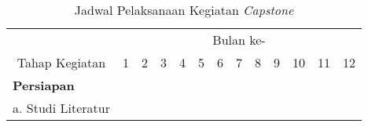         \begin{longtable}{|l|cccccccccccc|}
            \caption{Jadwal Pelaksanaan Kegiatan \textit{Capstone}}
            \label{tab:jadwal_pelaksanaan}
            \vspace{-0.75em}\\
            \hline
\multicolumn{1}{|c|}{}                                 & \multicolumn{12}{c|}{Bulan ke-}                                                                                                                                                                                                                                                                                                                                                                                                                                                                                                                                          \\ \cline{2-13} 
\multicolumn{1}{|c|}{\multirow{-2}{*}{Tahap Kegiatan}} & \multicolumn{1}{c|}{1}                        & \multicolumn{1}{c|}{2}                        & \multicolumn{1}{c|}{3}                        & \multicolumn{1}{c|}{4}                        & \multicolumn{1}{c|}{5}                        & \multicolumn{1}{c|}{6}                        & \multicolumn{1}{c|}{7}                        & \multicolumn{1}{c|}{8}                        & \multicolumn{1}{c|}{9}                        & \multicolumn{1}{c|}{10}                       & \multicolumn{1}{c|}{11}                       & 12                       \\ \hline
\textbf{Persiapan}                                              & \multicolumn{1}{c|}{}                         & \multicolumn{1}{c|}{}                         & \multicolumn{1}{c|}{}                         & \multicolumn{1}{c|}{}                         & \multicolumn{1}{c|}{}                         & \multicolumn{1}{c|}{}                         & \multicolumn{1}{c|}{}                         & \multicolumn{1}{c|}{}                         & \multicolumn{1}{c|}{}                         & \multicolumn{1}{c|}{}                         & \multicolumn{1}{c|}{}                         &                          \\
a. Studi Literatur                                     & \multicolumn{1}{c|}{\cellcolor[HTML]{333333}} & \multicolumn{1}{c|}{\cellcolor[HTML]{333333}} & \multicolumn{1}{c|}{}                         & \multicolumn{1}{c|}{}                         & \multicolumn{1}{c|}{}                         & \multicolumn{1}{c|}{}                         & \multicolumn{1}{c|}{}                         & \multicolumn{1}{c|}{}                         & \multicolumn{1}{c|}{}                         & \multicolumn{1}{c|}{}                         & \multicolumn{1}{c|}{}                         &                          \\

\end{longtable}
